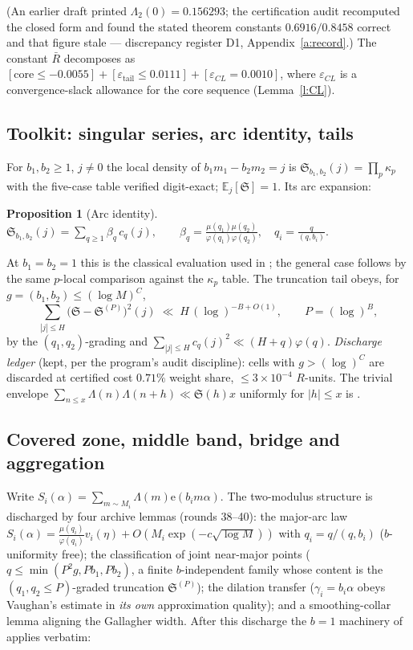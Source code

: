 \documentclass[11pt]{article}
\numberwithin{equation}{section}
\newtheorem{proposition}[theorem]{Proposition}
\theoremstyle{definition}
\theoremstyle{remark}
\newcommand{\LL}{\Lambda}
\newcommand{\SSS}{\mathfrak{S}}
\newcommand{\e}{\mathrm{e}}
\begin{document}
\noindent(An earlier draft printed $\Lambda_2(0)=0.156293$;
the certification audit recomputed the closed form and found the
stated theorem constants $0.6916/0.8458$ correct and that figure
stale --- discrepancy register D1, Appendix~\ref{a:record}.) The
constant $\bar R$ decomposes as $[\mathrm{core}\le-0.0055]+
[\varepsilon_{\mathrm{tail}}\le0.0111]+[\varepsilon_{CL}=0.0010]$,
where $\varepsilon_{CL}$ is a convergence-slack allowance for the
core sequence (Lemma~\ref{l:CL}).

\subsection{Toolkit: singular series, arc identity,
tails}\label{s:fm:toolkit}

For $b_1,b_2\ge1$, $j\ne0$ the local density of
$b_1m_1-b_2m_2=j$ is $\SSS_{b_1,b_2}(j)=\prod_p\kappa_p$ with the
five-case table verified digit-exact; $\mathbb E_j[\SSS]=1$. Its
arc expansion:

\begin{proposition}[Arc identity]\label{p:S}
$\displaystyle
\SSS_{b_1,b_2}(j)=\sum_{q\ge1}\beta_q\,c_q(j),\qquad
\beta_q=\frac{\mu(q_1)\mu(q_2)}{\varphi(q_1)\varphi(q_2)},\quad
q_i=\frac{q}{(q,b_i)}.$
\end{proposition}

\noindent At $b_1=b_2=1$ this is the classical evaluation used in
\cite[(66)--(67)]{MRT}; the general case follows by the same
$p$-local comparison against the $\kappa_p$ table. The truncation
tail obeys, for $g=(b_1,b_2)\le(\log M)^{C}$,
\begin{equation}\label{e:X2}
\textstyle\sum_{|j|\le H}\bigl(\SSS-\SSS^{(P)}\bigr)^2(j)\;\ll\;
H\,(\log)^{-B+O(1)},\qquad P=(\log)^{B},
\end{equation}
by the $(q_1,q_2)$-grading and $\sum_{|j|\le H}c_q(j)^2\ll(H+q)
\varphi(q)$. \emph{Discharge ledger} (kept, per the program's
audit discipline): cells with $g>(\log)^{C}$ are discarded at
certified cost $0.71\%$ weight share, $\le3\times10^{-4}$
$R$-units. The trivial envelope
$\sum_{n\le x}\LL(n)\LL(n+h)\ll\SSS(h)x$ uniformly for
$|h|\le x$ is \cite[Cor.~3.14]{HR}.

\subsection{Covered zone, middle band, bridge and
aggregation}\label{s:fm:R}

Write $S_i(\alpha)=\sum_{m\sim M_i}\LL(m)\e(b_im\alpha)$. The
two-modulus structure is discharged by four archive lemmas
(rounds 38--40): the major-arc law
$S_i(\alpha)=\frac{\mu(q_i)}{\varphi(q_i)}v_i(\eta)
+O(M_i\exp(-c\sqrt{\log M}))$ with $q_i=q/(q,b_i)$
($b$-uniformity free); the classification of joint near-major
points ($q\le\min(P^2g,Pb_1,Pb_2)$, a finite $b$-independent
family whose content is the $(q_1,q_2\le P)$-graded truncation
$\SSS^{(P)}$); the dilation transfer ($\gamma_i=b_i\alpha$ obeys
Vaughan's estimate in \emph{its own} approximation quality); and
a smoothing-collar lemma aligning the Gallagher width. After this
discharge the $b=1$ machinery of \cite{MRT} applies verbatim:
\end{document}
